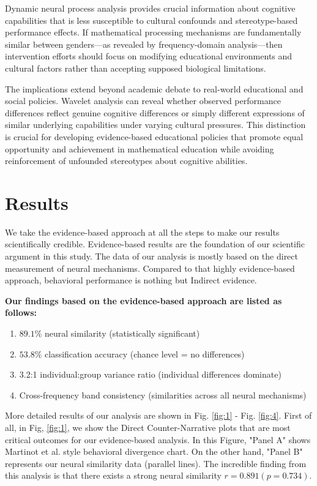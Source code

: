 \documentclass[pdflatex,sn-nature]{sn-jnl}%
\theoremstyle{thmstyleone}%
\theoremstyle{thmstyletwo}%
\theoremstyle{thmstylethree}%
\begin{document}
Dynamic neural process analysis provides crucial information about cognitive capabilities that is less susceptible to cultural confounds and stereotype-based performance effects. If mathematical processing mechanisms are fundamentally similar between genders—as revealed by frequency-domain analysis—then intervention efforts should focus on modifying educational environments and cultural factors rather than accepting supposed biological limitations.

The implications extend beyond academic debate to real-world educational and social policies. Wavelet analysis can reveal whether observed performance differences reflect genuine cognitive differences or simply different expressions of similar underlying capabilities under varying cultural pressures. This distinction is crucial for developing evidence-based educational policies that promote equal opportunity and achievement in mathematical education while avoiding reinforcement of unfounded stereotypes about cognitive abilities.


\section{Results}\label{sec2}
We take the evidence-based approach at all the steps to make our results scientifically credible. Evidence-based results are the foundation of our scientific argument in this study. The data of our analysis is mostly based on the direct measurement of neural mechanisms. Compared to that highly evidence-based approach, behavioral performance is nothing but Indirect evidence. 

\medskip\noindent
\textbf{Our findings based on the evidence-based approach are listed as follows:}
\begin{enumerate}
\item $89.1$\% neural similarity (statistically significant)
\item $53.8$\% classification accuracy (chance level = no differences)
\item 3.2:1 individual:group variance ratio (individual differences dominate)
\item Cross-frequency band consistency (similarities across all neural mechanisms)
\end{enumerate}

\medskip\noindent
More detailed results of our analysis are shown in Fig. \ref{fig:1} - Fig. \ref{fig:4}. First of all, in Fig, \ref{fig:1}, we show the Direct Counter-Narrative plots that are most critical outcomes for our evidence-based analysis. In this Figure, "Panel A" shows Martinot et al. style behavioral divergence chart. On the other hand, "Panel B" represents our neural similarity data (parallel lines). The incredible finding from this analysis is that there exists a strong neural similarity $r = 0.891 (p = 0.734)$. 
\end{document}
